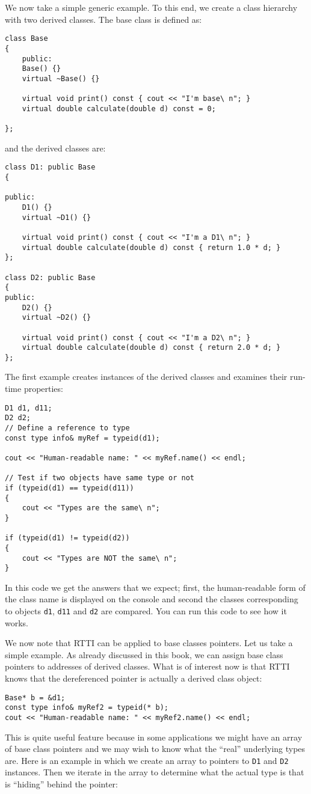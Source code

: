 We now take a simple generic example. To this end, we create a class hierarchy with two derived classes. The base class is defined as:
\begin{lstlisting}
class Base
{
	public:
	Base() {}
	virtual ~Base() {}

	virtual void print() const { cout << "I'm base\ n"; }
	virtual double calculate(double d) const = 0;

};
\end{lstlisting}
and the derived classes are:
\begin{lstlisting}
class D1: public Base
{

public:
	D1() {}
	virtual ~D1() {}

	virtual void print() const { cout << "I'm a D1\ n"; }
	virtual double calculate(double d) const { return 1.0 * d; }
};

class D2: public Base
{
public:
	D2() {}
	virtual ~D2() {}

	virtual void print() const { cout << "I'm a D2\ n"; }
	virtual double calculate(double d) const { return 2.0 * d; }
};
\end{lstlisting}
The first example creates instances of the derived classes and examines their run-time properties:
\begin{lstlisting}
D1 d1, d11;
D2 d2;
// Define a reference to type
const type info& myRef = typeid(d1);

cout << "Human-readable name: " << myRef.name() << endl;

// Test if two objects have same type or not
if (typeid(d1) == typeid(d11))
{
	cout << "Types are the same\ n";
}

if (typeid(d1) != typeid(d2))
{
	cout << "Types are NOT the same\ n";
}
\end{lstlisting}
In this code we get the answers that we expect; first, the human-readable form of the class name is displayed on the console and second the classes corresponding to objects \texttt{d1}, \texttt{d11} and \texttt{d2} are compared. You can run this code to see how it works.

We now note that RTTI can be applied to base classes pointers. Let us take a simple example. As already discussed in this book, we can assign base class pointers to addresses of derived classes. What is of interest now is that RTTI knows that the dereferenced pointer is actually a derived class object:
\begin{lstlisting}
Base* b = &d1;
const type info& myRef2 = typeid(* b);
cout << "Human-readable name: " << myRef2.name() << endl;
\end{lstlisting}
This is quite useful feature because in some applications we might have an array of base class pointers and we may wish to know what the ``real'' underlying types are. Here is an example in which we create an array to pointers to \texttt{D1} and \texttt{D2} instances. Then we iterate in the array to determine what the actual type is that is ``hiding'' behind the pointer:

